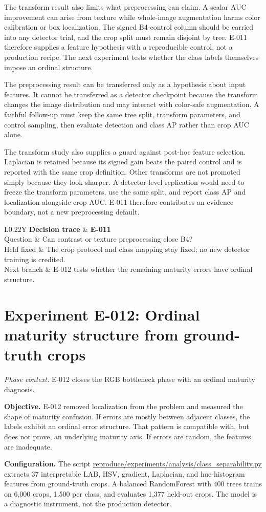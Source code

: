 \documentclass[preprint,12pt]{elsarticle}
\newcommand{\pathcode}[1]{\scriptsize\url{#1}}
\newcommand{\experiment}[2]{\par\medskip\Needspace{7\baselineskip}\section{Experiment #1: #2}}
\newcommand{\decisioncard}[4]{%
\begin{table}[H]\centering\small
\begin{tabularx}{\columnwidth}{L{0.22\columnwidth}Y}
\toprule
\textbf{Decision trace} & \textbf{#1}\\
Question & #2\\
Held fixed & #3\\
Next branch & #4\\
\bottomrule
\end{tabularx}
\end{table}}
\newcommand{\phasecontext}[1]{%
\par\smallskip\noindent\textit{Phase context.} #1\par\smallskip}
\begin{document}
The transform result also limits what preprocessing can claim. A scalar AUC
improvement can arise from texture while whole-image augmentation harms color
calibration or box localization. The signed B4-control column should be
carried into any detector trial, and the crop split must remain disjoint by
tree. E-011 therefore supplies a feature hypothesis with a reproducible
control, not a production recipe. The next experiment tests whether the class
labels themselves impose an ordinal structure.

The preprocessing result can be transferred only as a hypothesis about input
features. It cannot be transferred as a detector checkpoint because the
transform changes the image distribution and may interact with color-safe
augmentation. A faithful follow-up must keep the same tree split, transform
parameters, and control sampling, then evaluate detection and class AP rather
than crop AUC alone.

The transform study also supplies a guard against post-hoc feature selection.
Laplacian is retained because its signed gain beats the paired control and is
reported with the same crop definition. Other transforms are not promoted
simply because they look sharper. A detector-level replication would need to
freeze the transform parameters, use the same split, and report class AP and
localization alongside crop AUC. E-011 therefore contributes an evidence
boundary, not a new preprocessing default.

\decisioncard{E-011}{Can contrast or texture preprocessing close B4?}{The crop protocol and class mapping stay fixed; no new detector training is credited.}{E-012 tests whether the remaining maturity errors have ordinal structure.}
\experiment{E-012}{Ordinal maturity structure from ground-truth crops}
\phasecontext{E-012 closes the RGB bottleneck phase with an ordinal maturity diagnosis.}
\textbf{Objective.} E-012 removed localization from the problem and measured
the shape of maturity confusion. If errors are mostly between adjacent
classes, the labels exhibit an ordinal error structure. That pattern is
compatible with, but does not prove, an underlying maturity axis. If errors
are random, the features are inadequate.

\textbf{Configuration.} The script
\pathcode{reproduce/experiments/analysis/class_separability.py} extracts 37
interpretable LAB, HSV, gradient, Laplacian, and hue-histogram features from
ground-truth crops. A balanced RandomForest with 400 trees trains on 6,000
crops, 1,500 per class, and evaluates 1,377 held-out crops. The model is a
diagnostic instrument, not the production detector.
\end{document}
